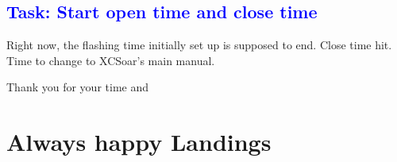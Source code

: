\documentclass[english,a4paper,12pt,utf8]{scrreprt}
\begin{document}
\subsection*{\textcolor{blue}{Task: Start open time and close time}}
Right now, the flashing time initially set up is supposed to end.
Close time hit. Time to change to XCSoar's main manual.

Thank you for your time and

\section{Always happy Landings}%

\printindex
\end{document}
